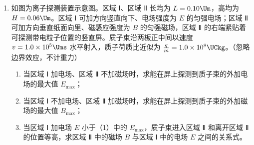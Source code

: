 \documentclass[\gkver]{gaokaozhenti}
\begin{document}
\begin{enumerate}
{	由题意知，相邻条纹的间距为 $\Delta x=\frac{1}{5}\times(25.70-19.40)\Umm=1.26\Umm$，根据 $\Delta x=\frac{L}{d}\lambda$ 解得 $\lambda=4.2\times10^{-7}\Um=420\Unm$。
}

\item
如图为离子探测装置示意图。区域 Ⅰ、区域 Ⅱ 长均为 $L=0.10\Um$，高均为 $H=0.06\Um$。区域 Ⅰ 可加方向竖直向下、电场强度为 $E$ 的匀强电场；区域 Ⅱ 可加方向垂直纸面向里、磁感应强度为 $B$ 的匀强磁场，区域 Ⅱ 的右端紧贴着可探测带电粒子位置的竖直屏。质子束沿两板正中间以速度 $v=1.0\times10^{5}\Ums$ 水平射入，质子荷质比近似为 $\frac{q}{m}=1.0\times10^{8}\UCkg$。（忽略边界效应，不计重力）
\begin{enumerate}
	\item
	当区域 Ⅰ 加电场、区域 Ⅱ 不加磁场时，求能在屏上探测到质子束的外加电场的最大值 $E_{\max}$；
	\item
	当区域 Ⅰ 不加电场、区域 Ⅱ 加磁场时，求能在屏上探测到质子束的外加磁场的最大值 $B_{\max}$；
	\item
	当区域 Ⅰ 加电场 $E$ 小于（1）中的 $E_{\max}$，质子束进入区域 Ⅱ 和离开区域 Ⅱ 的位置等高，求区域 Ⅱ 中的磁场 $B$ 与区域 Ⅰ 中的电场 $E$ 之间的关系式。
\end{enumerate}


\end{enumerate}
\end{document}
